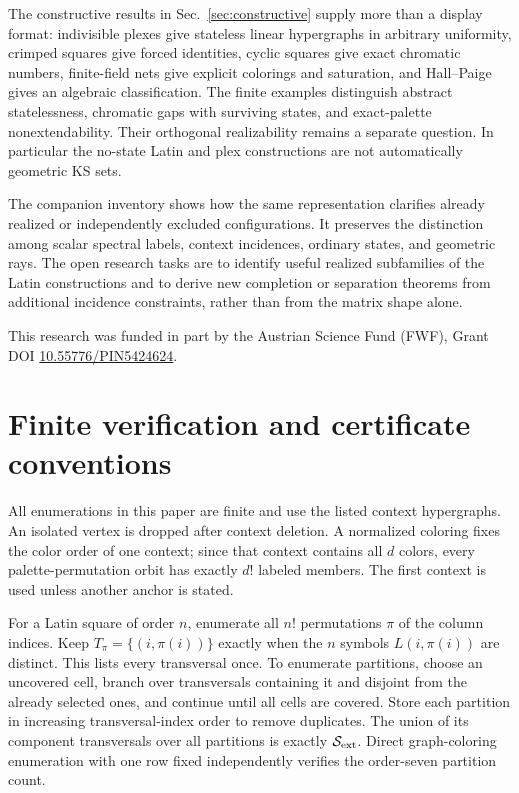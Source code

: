 \documentclass[aps,pra,reprint,superscriptaddress,longbibliography,nofootinbib,floatfix,10pt]{revtex4-2}
\theoremstyle{definition}\newtheorem{definition}[theorem]{Definition}
\theoremstyle{remark}\newtheorem{remark}[theorem]{Remark}
\newcommand{\Sc}{\mathcal S}\newcommand{\Cc}{\mathcal C}
\begin{document}
The constructive results in Sec.~\ref{sec:constructive} supply more than a display format: indivisible plexes give stateless linear hypergraphs in arbitrary uniformity, crimped squares give forced identities, cyclic squares give exact chromatic numbers, finite-field nets give explicit colorings and saturation, and Hall--Paige gives an algebraic classification. The finite examples distinguish abstract statelessness, chromatic gaps with surviving states, and exact-palette nonextendability. Their orthogonal realizability remains a separate question. In particular the no-state Latin and plex constructions are not automatically geometric KS sets.

The companion inventory shows how the same representation clarifies already realized or independently excluded configurations. It preserves the distinction among scalar spectral labels, context incidences, ordinary states, and geometric rays. The open research tasks are to identify useful realized subfamilies of the Latin constructions and to derive new completion or separation theorems from additional incidence constraints, rather than from the matrix shape alone.

\begin{acknowledgments}
This research was funded in part by the Austrian Science Fund (FWF), Grant DOI \href{https://doi.org/10.55776/PIN5424624}{10.55776/PIN5424624}.
\end{acknowledgments}

\clearpage
\appendix
\section{Finite verification and certificate conventions}\label{app:verification}

All enumerations in this paper are finite and use the listed context hypergraphs. An isolated vertex is dropped after context deletion. A normalized coloring fixes the color order of one context; since that context contains all $d$ colors, every palette-permutation orbit has exactly $d!$ labeled members. The first context is used unless another anchor is stated.

For a Latin square of order $n$, enumerate all $n!$ permutations $\pi$ of the column indices. Keep $T_\pi=\{(i,\pi(i))\}$ exactly when the $n$ symbols $L(i,\pi(i))$ are distinct. This lists every transversal once. To enumerate partitions, choose an uncovered cell, branch over transversals containing it and disjoint from the already selected ones, and continue until all cells are covered. Store each partition in increasing transversal-index order to remove duplicates. The union of its component transversals over all partitions is exactly $\Sc_{\rm ext}$. Direct graph-coloring enumeration with one row fixed independently verifies the order-seven partition count.
\end{document}

